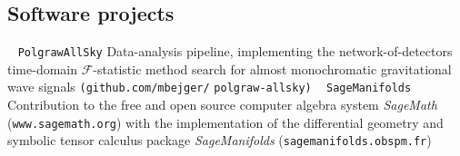 \documentclass[]{friggeri-cv} %
\begin{document}
\pagebreak 
{} %

\pagebreak

\setlength{\voffset}{0pt}
\begin{aside}
\section{Software projects} 
~
{\tt PolgrawAllSky}
{Data-analysis pipeline, implementing the network-of-detectors time-domain $\mathcal{F}$-statistic method search for almost monochromatic gravitational wave signals {\tt (github.com/mbejger/}} 
{\tt polgraw-allsky)}
~
{\tt SageManifolds}
{Contribution to the free and open source computer algebra system {\it SageMath} ({\tt www.sagemath.org}) with the implementation of the differential geometry and symbolic tensor calculus package {\it SageManifolds} ({\tt sagemanifolds.obspm.fr})}
\end{aside}

%
%
%
%
%
\end{document}
